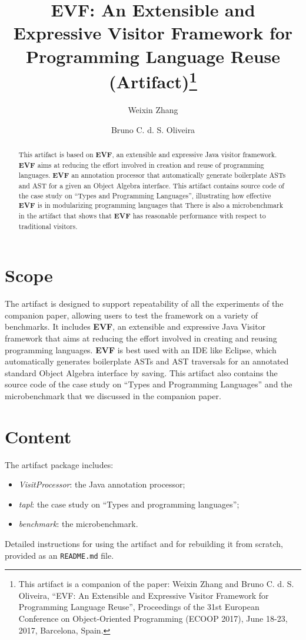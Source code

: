 \documentclass[a4paper,UKenglish]{darts}
\title{EVF: An Extensible and Expressive Visitor Framework for Programming
  Language Reuse (Artifact)\footnote{This artifact is a companion of the paper:
    Weixin Zhang and Bruno C. d. S. Oliveira, ``EVF: An Extensible and Expressive Visitor Framework for Programming
  Language Reuse'', Proceedings of the 31st European Conference on Object-Oriented Programming (ECOOP 2017), June 18-23, 2017, Barcelona, Spain.}}
\author{Weixin Zhang}
\author{Bruno C. d. S. Oliveira}
\affil{The University of Hong Kong, Hong Kong, China\\
  \texttt{\{wxzhang2,bruno\}@cs.hku.hk}}
\newenvironment{scope}{\section{Scope}}{}
\newenvironment{content}{\section{Content}}{}
\begin{document}
\maketitle

\begin{abstract}
  This artifact is based on {\bf EVF}, an extensible and expressive Java
  {\sc visitor} framework. {\bf EVF} aims at reducing the effort involved in
  creation and reuse of programming languages. {\bf EVF} an annotation processor
  that automatically generate boilerplate ASTs and AST for a given an Object
  Algebra interface. This artifact contains source code of the
  case study on ``Types and Programming Languages'', illustrating how effective
  {\bf EVF} is in modularizing programming languages that
  There is also a microbenchmark in the artifact that shows that {\bf EVF} has
  reasonable performance with respect to traditional visitors.
 \end{abstract}


\begin{scope}
  The artifact is designed to support repeatability of all the experiments of the 
  companion paper, allowing users to test the framework on a variety of benchmarks.
  It includes {\bf EVF}, an extensible and expressive Java {\sc Visitor} framework
  that aims at reducing the effort involved in
  creating and reusing programming languages.
  {\bf EVF} is best used with an IDE like Eclipse, which automatically generates
  boilerplate ASTs and AST traversals for an annotated standard Object Algebra
  interface by saving.
  This artifact also contains the source code of the case study on ``Types and
  Programming Languages'' and the microbenchmark that we discussed in the
  companion paper.
\end{scope}

\begin{content}
  The artifact package includes:
  \begin{itemize}
  \item \emph{VisitProcessor}: the Java annotation processor;
  \item \emph{tapl}: the case study on ``Types and programming languages'';
  \item \emph{benchmark}: the microbenchmark.
  \end{itemize}
  Detailed instructions for using the artifact and for rebuilding it from scratch, provided as an {\tt README.md} file.
\end{content}
\end{document}
